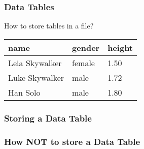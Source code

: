\documentclass[12pt]{beamer}\usepackage[]{graphicx}\usepackage[]{color}
\begin{document}

\begin{frame}
\begin{center}
\Huge{}
\end{center}
\end{frame}


\begin{frame}[fragile]
\frametitle{Data Tables}

\begin{center}
{\Large How to store tables in a file?}

\bigskip

 \begin{tabular}{| l | l | l |}
  \hline
name & gender & height \\
  \hline
Leia Skywalker & female & 1.50 \\
  \hline
Luke Skywalker & male & 1.72 \\
  \hline
Han Solo & male & 1.80 \\
  \hline
 \end{tabular}
\end{center}

\end{frame}


\begin{frame}[fragile]
\frametitle{Storing a Data Table}
\begin{center}
\end{center}
\end{frame}


\begin{frame}[fragile]
\frametitle{How NOT to store a Data Table}
\begin{center}
\end{center}
\end{frame}


\begin{frame}[fragile]
\frametitle{}
\begin{center}
\end{center}
\end{frame}
\end{document}
